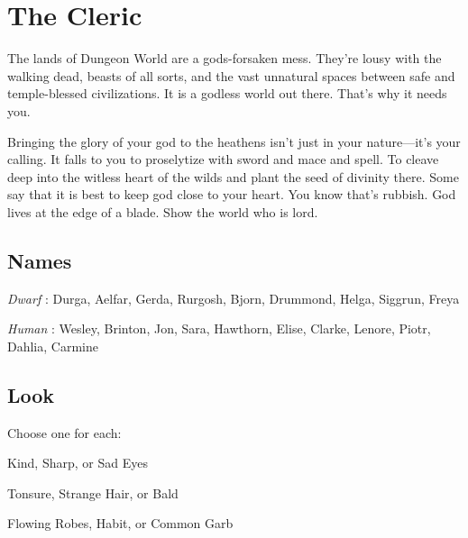 \chapter{The Cleric}
  
            

         

The lands of Dungeon World are a gods-forsaken mess. They’re lousy with the walking dead, beasts of all sorts, and the vast unnatural spaces between safe and temple-blessed civilizations. It is a godless world out there. That’s why it needs you.

         

Bringing the glory of your god to the heathens isn’t just in your nature—it’s your calling. It falls to you to proselytize with sword and mace and spell. To cleave deep into the witless heart of the wilds and plant the seed of divinity there. Some say that it is best to keep god close to your heart. You know that’s rubbish. God lives at the edge of a blade. Show the world who is lord.

       

       
\section{Names}   
       

         

           {\em Dwarf} : Durga, Aelfar, Gerda, Rurgosh, Bjorn, Drummond, Helga, Siggrun, Freya

         

           {\em Human} : Wesley, Brinton, Jon, Sara, Hawthorn, Elise, Clarke, Lenore, Piotr, Dahlia, Carmine

       

       
\section{Look}  
       

         

Choose one for each:

         

Kind, Sharp, or Sad Eyes

         

Tonsure, Strange Hair, or Bald

         

Flowing Robes, Habit, or Common Garb

         

